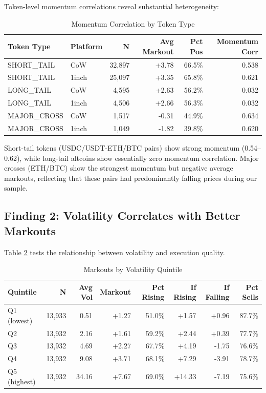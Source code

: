 \documentclass[12pt,a4paper]{article}
\begin{document}
Token-level momentum correlations reveal substantial heterogeneity:

\begin{table}[H]
\centering
\caption{Momentum Correlation by Token Type}
\label{tab:token_momentum}
\begin{tabular}{llrrrr}
\toprule
\textbf{Token Type} & \textbf{Platform} & \textbf{N} & \textbf{Avg Markout} & \textbf{Pct Pos} & \textbf{Momentum Corr} \\
\midrule
SHORT\_TAIL & CoW & 32,897 & +3.78 & 66.5\% & 0.538 \\
SHORT\_TAIL & 1inch & 25,097 & +3.35 & 65.8\% & 0.621 \\
LONG\_TAIL & CoW & 4,595 & +2.63 & 56.2\% & 0.032 \\
LONG\_TAIL & 1inch & 4,506 & +2.66 & 56.3\% & 0.032 \\
MAJOR\_CROSS & CoW & 1,517 & -0.31 & 44.9\% & 0.634 \\
MAJOR\_CROSS & 1inch & 1,049 & -1.82 & 39.8\% & 0.620 \\
\bottomrule
\end{tabular}
\end{table}

Short-tail tokens (USDC/USDT-ETH/BTC pairs) show strong momentum (0.54--0.62), while long-tail altcoins show essentially zero momentum correlation. Major crosses (ETH/BTC) show the strongest momentum but negative average markouts, reflecting that these pairs had predominantly falling prices during our sample.

\subsection{Finding 2: Volatility Correlates with Better Markouts}

Table \ref{tab:volatility} tests the relationship between volatility and execution quality.

\begin{table}[H]
\centering
\caption{Markouts by Volatility Quintile}
\label{tab:volatility}
\begin{tabular}{lrrrrrrr}
\toprule
\textbf{Quintile} & \textbf{N} & \textbf{Avg Vol} & \textbf{Markout} & \textbf{Pct Rising} & \textbf{If Rising} & \textbf{If Falling} & \textbf{Pct Sells} \\
\midrule
Q1 (lowest) & 13,933 & 0.51 & +1.27 & 51.0\% & +1.57 & +0.96 & 87.7\% \\
Q2 & 13,932 & 2.16 & +1.61 & 59.2\% & +2.44 & +0.39 & 77.7\% \\
Q3 & 13,932 & 4.69 & +2.27 & 67.7\% & +4.19 & -1.75 & 76.6\% \\
Q4 & 13,932 & 9.08 & +3.71 & 68.1\% & +7.29 & -3.91 & 78.7\% \\
Q5 (highest) & 13,932 & 34.16 & +7.67 & 69.0\% & +14.33 & -7.19 & 75.6\% \\
\bottomrule
\end{tabular}
\end{table}
\end{document}
